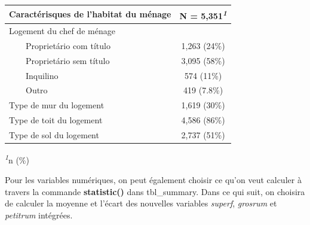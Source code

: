\documentclass[
]{article}
\begin{document}
\begin{table}[!t]
\fontsize{12.0pt}{14.4pt}\selectfont
\begin{tabular*}{\linewidth}{@{\extracolsep{\fill}}lc}
\toprule
Caractérisques de l'habitat du ménage & \textbf{N = 5,351}\textsuperscript{\textit{1}} \\ 
\midrule\addlinespace[2.5pt]
Logement du chef de ménage &  \\ 
    Proprietário com título & 1,263 (24\%) \\ 
    Proprietário sem título & 3,095 (58\%) \\ 
    Inquilino & 574 (11\%) \\ 
    Outro & 419 (7.8\%) \\ 
Type de mur du logement & 1,619 (30\%) \\ 
Type de toit du logement & 4,586 (86\%) \\ 
Type de sol du logement & 2,737 (51\%) \\ 
\bottomrule
\end{tabular*}
\begin{minipage}{\linewidth}
\textsuperscript{\textit{1}}n (\%)\\
\end{minipage}
\end{table}

Pour les variables numériques, on peut également choisir ce qu'on veut
calculer à travers la commande \textbf{statistic()} dans tbl\_summary.
Dans ce qui suit, on choisira de calculer la moyenne et l'écart des
nouvelles variables \emph{superf}, \emph{grosrum} et \emph{petitrum}
intégrées.
\end{document}
